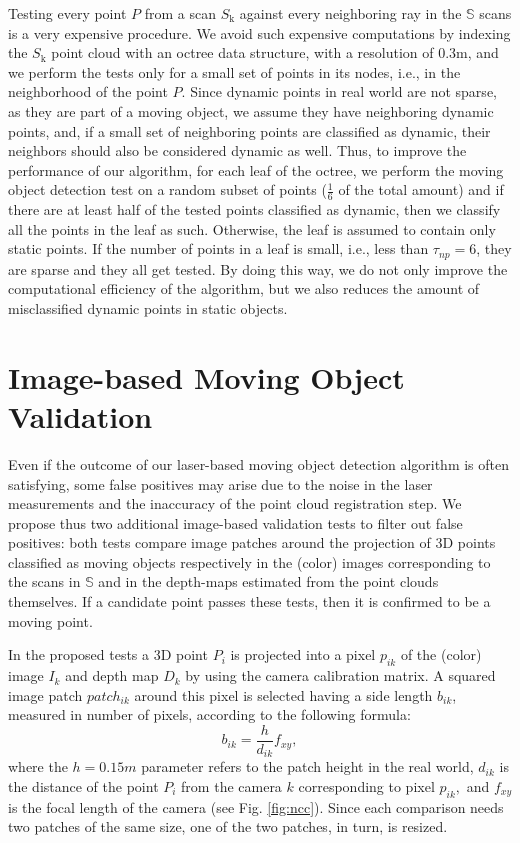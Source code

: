 Testing every point $P$ from a scan $S_{\text{k}}$ against every neighboring ray in the $\mathbb{S}$ scans is a very expensive procedure. 
We avoid such expensive computations by indexing the $S_{\text{k}}$ point cloud with an octree data structure, with a resolution of 0.3m, and we perform the tests only for a small set of points in its nodes, i.e., in the neighborhood of the point $P$.
Since dynamic points in real world are not sparse, as they are part of a moving object, we assume they have neighboring dynamic points, and, if a small set of neighboring points are classified as dynamic, their neighbors should also be considered dynamic as well. 
Thus, to improve the performance of our algorithm, for each leaf of the octree, we perform the moving object detection test on a random subset of points ($\frac{1}{6}$ of the total amount) and if there are at least half of the tested points classified as dynamic, then we classify all the points in the leaf as such. Otherwise, the leaf is assumed to contain only static points.
If the number of points in a leaf is small, i.e., less than $\tau_{np}=6$, they are sparse and they all get tested. By doing this way, we do not only improve the computational efficiency of the algorithm, but we also reduces the amount of misclassified dynamic points in static objects.


\section{Image-based Moving Object Validation}%
\label{sec:images}
Even if the outcome of our laser-based moving object detection algorithm is often satisfying, some false positives may arise due to the noise in the laser measurements and the inaccuracy of the point cloud registration step. 
We propose thus two additional image-based validation tests to filter out false positives: both tests compare image patches around the projection of 3D points classified as moving objects respectively in the (color) images corresponding to the scans in $\mathbb{S}$ and in the depth-maps estimated from the point clouds themselves. If a candidate point passes these tests, then it is confirmed to be a moving point.

In the proposed tests a 3D point $P_i$ is projected into a pixel $p_{ik}$ of the (color) image $I_k$ and depth map $D_k$ by using the camera calibration matrix. A squared image patch $patch_{ik}$ around this pixel is selected having a side length $b_{ik}$, measured in number of pixels, according to the following formula:
\begin{equation}
 b_{ik} = \frac{h}{d_{ik}}f_{xy},
\end{equation}
where the $h=0.15m$ parameter refers to the patch height in the real world, $d_{ik}$ is the distance of the point $P_i$ from the camera $k$ corresponding to pixel $p_{ik},$ and $f_{xy}$ is the focal length of the camera (see Fig. \ref{fig:ncc}).
Since each comparison needs two patches of the same size, one of the two patches, in turn, is resized.

